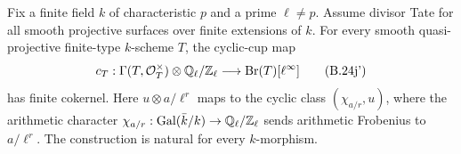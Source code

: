 \begin{lemma}
\label{lem:B-unit-cup-generation}
Fix a finite field \(k\) of characteristic \(p\) and a
prime \(\ell\ne p\).  Assume divisor Tate for all smooth
projective surfaces over finite extensions of \(k\).
For every smooth quasi-projective finite-type \(k\)-scheme \(T\),
the cyclic-cup map
\[
 c_T:\Gamma(T,\mathcal O_T^\times)\otimes
                  \mathbb Q_\ell/\mathbb Z_\ell
       \longrightarrow \operatorname{Br}(T)[\ell^\infty]         \tag{B.24j'}
\]
has finite cokernel.  Here \(u\otimes a/\ell^r\) maps to
the cyclic class \((\chi_{a/r},u)\), where the arithmetic
character \(\chi_{a/r}:\operatorname{Gal}(\bar k/k)\to
\mathbb Q_\ell/\mathbb Z_\ell\) sends arithmetic Frobenius to
\(a/\ell^r\).  The construction is natural for every
\(k\)-morphism.
\end{lemma}
